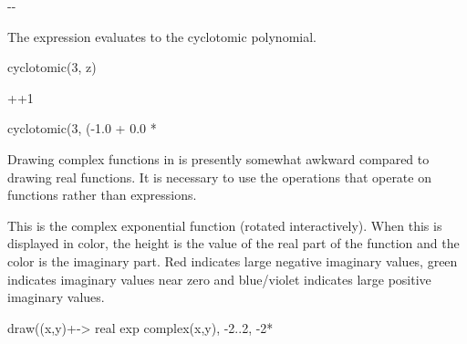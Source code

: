 {{{{{{{{{{{\begin{xtc}
\begin{TeXOutput}
\begin{fricasmath}{23}
-{}-{\TIMES \ImaginaryI }%
\end{fricasmath}
\end{TeXOutput}
\end{xtc}
\begin{xtc}
\begin{xtccomment}
The expression
 evaluates to the  cyclotomic polynomial.
\end{xtccomment}
\begin{spadsrc}
cyclotomic(3, z)
\end{spadsrc}
\begin{TeXOutput}
\begin{fricasmath}{24}
++1%
\end{fricasmath}
\end{TeXOutput}
\end{xtc}
\begin{xtc}
\begin{xtccomment}
\end{xtccomment}
\begin{spadsrc}
cyclotomic(3, (-1.0 + 0.0 * %
\end{spadsrc}
\begin{TeXOutput}
\begin{fricasmath}{25}
%
\end{fricasmath}
\end{TeXOutput}
\end{xtc}

Drawing complex functions in \Language{} is presently somewhat
awkward compared to drawing real functions.
It is necessary to use the  operations that operate
on functions rather than expressions.

\begin{psXtc}
\begin{xtccomment}
This is the complex exponential function (rotated interactively).
When this is displayed in color, the height is the value of the real part of
the function and the color is the imaginary part.
Red indicates large negative imaginary values, green indicates imaginary
values near zero and blue/violet indicates large positive imaginary values.
\end{xtccomment}
\begin{spadsrc}
draw((x,y)+-> real exp complex(x,y), -2..2, -2*%
\end{spadsrc}
\end{psXtc}

}}}}}}}}}}}
